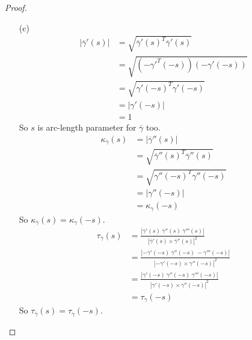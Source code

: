 \documentclass[10pt,a4paper]{article}
\begin{document}
\begin{proof}
\begin{enumerate}
\item[(c)]
\begin{align*}
\left|\overline{\gamma}'(s)\right|&=\sqrt{\overline{\gamma}'(s)^T\overline{\gamma}'(s)}\\
&=\sqrt{\left(-\gamma'^T(-s)\right)\left(-\gamma'(-s)\right)}\\
&=\sqrt{\gamma'(-s)^T\gamma'(-s)}\\
&=\left|\gamma'(-s)\right|\\
&=1
\end{align*}
So $s$ is arc-length parameter for $\overline{\gamma}$ too.\\
\begin{align*}
\kappa_{\overline{\gamma}}(s)&=\left|\overline{\gamma}''(s)\right|\\
&=\sqrt{\overline{\gamma}''(s)^T\overline{\gamma}''(s)}\\
&=\sqrt{\gamma''(-s)^T\gamma''(-s)}\\
&=\left|\gamma''(-s)\right|\\
&=\kappa_{\gamma}(-s)
\end{align*}
So $\kappa_{\overline{\gamma}}(s)=\kappa_{\gamma}(-s)$.
\begin{align*}
\tau_{\overline{\gamma}}(s)&=\frac{\left|\overline{\gamma}'(s)\ \overline{\gamma}''(s)\ \overline{\gamma}'''(s)\right|}{\left|\overline{\gamma}'(s)\times\overline{\gamma}''(s)\right|^2}\\
&=\frac{\left|-\gamma'(-s)\ \gamma''(-s)\ -\gamma'''(-s)\right|}{\left|-\gamma'(-s)\times\gamma''(-s)\right|^2}\\
&=\frac{\left|\gamma'(-s)\ \gamma''(-s)\ \gamma'''(-s)\right|}{\left|\gamma'(-s)\times\gamma''(-s)\right|^2}\\
&=\tau_{\gamma}(-s)
\end{align*}
So $\tau_{\overline{\gamma}}(s)=\tau_{\gamma}(-s)$.
\end{enumerate}
\end{proof}
\end{document}
